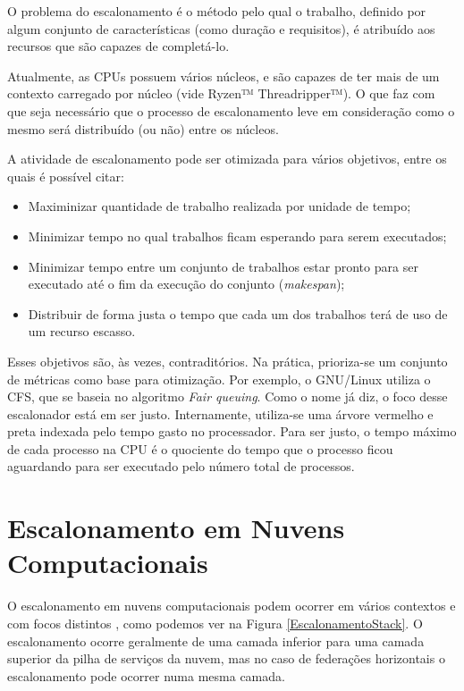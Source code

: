 O problema do escalonamento é o método pelo qual o trabalho, definido por algum conjunto de características (como duração e requisitos), é atribuído aos recursos que são capazes de completá-lo. %

Atualmente, as \acrshort{CPU}s possuem vários núcleos, e são capazes de ter mais de um contexto carregado por núcleo (vide Ryzen™ Threadripper™\cite{Ryzen}). O que faz com que seja necessário que o processo de escalonamento leve em consideração como o mesmo será distribuído (ou não) entre os núcleos.

A atividade de escalonamento pode ser otimizada para vários objetivos, entre os quais é possível citar\cite{TANEMBAUM_SO}:
\begin{itemize}
	\item Maximinizar quantidade de trabalho realizada por unidade de tempo;
	\item Minimizar tempo no qual trabalhos ficam esperando para serem executados;
	\item Minimizar tempo entre um conjunto de trabalhos estar pronto para ser executado até o fim da execução do conjunto (\textit{makespan});
	\item Distribuir de forma justa o tempo que cada um dos trabalhos terá de uso de um recurso escasso.
\end{itemize}

Esses objetivos são, às vezes, contraditórios. Na prática, prioriza-se um conjunto de métricas como base para otimização. Por exemplo, o GNU/Linux utiliza o \acrfull{CFS}, que se baseia no algoritmo \textit{Fair queuing}. Como o nome já diz, o foco desse escalonador está em ser justo. Internamente, utiliza-se uma árvore vermelho e preta indexada pelo tempo gasto no processador. Para ser justo, o tempo máximo de cada processo na \acrshort{CPU} é o quociente do tempo que o processo ficou aguardando para ser executado pelo número total de processos.

\section{Escalonamento em Nuvens Computacionais}
O escalonamento em nuvens computacionais podem ocorrer em vários contextos e com focos distintos \cite{Zhan:2015:CCR:2775083.2788397}, como podemos ver na Figura \ref{EscalonamentoStack}. O escalonamento ocorre geralmente de uma camada inferior para uma camada superior da pilha de serviços da nuvem, mas no caso de federações horizontais o escalonamento pode ocorrer numa mesma camada. 

